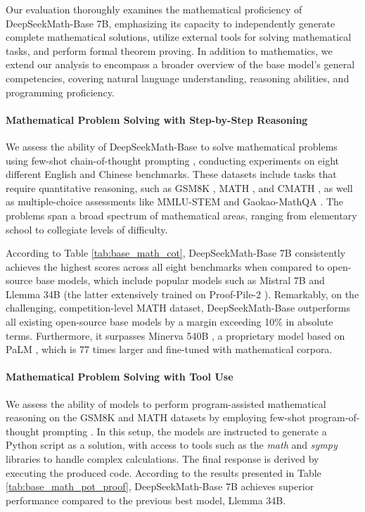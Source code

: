 \begin{itemize}[topsep=0pt]
Our evaluation thoroughly examines the mathematical proficiency of DeepSeekMath-Base 7B, emphasizing its capacity to independently generate complete mathematical solutions, utilize external tools for solving mathematical tasks, and perform formal theorem proving. In addition to mathematics, we extend our analysis to encompass a broader overview of the base model's general competencies, covering natural language understanding, reasoning abilities, and programming proficiency.

\paragraph{Mathematical Problem Solving with Step-by-Step Reasoning}

We assess the ability of DeepSeekMath-Base to solve mathematical problems using few-shot chain-of-thought prompting \citep{cot}, conducting experiments on eight different English and Chinese benchmarks. These datasets include tasks that require quantitative reasoning, such as GSM8K \citep{gsm8k}, MATH \citep{MATH}, and CMATH \citep{wei2023cmath}, as well as multiple-choice assessments like MMLU-STEM \citep{mmlu} and Gaokao-MathQA \citep{agieval}. The problems span a broad spectrum of mathematical areas, ranging from elementary school to collegiate levels of difficulty.

According to Table \ref{tab:base_math_cot}, DeepSeekMath-Base 7B consistently achieves the highest scores across all eight benchmarks when compared to open-source base models, which include popular models such as Mistral 7B \citep{mistral} and Llemma 34B \citep{llemma} (the latter extensively trained on Proof-Pile-2 \citep{llemma}). Remarkably, on the challenging, competition-level MATH dataset, DeepSeekMath-Base outperforms all existing open-source base models by a margin exceeding 10\% in absolute terms. Furthermore, it surpasses Minerva 540B \citep{minerva}, a proprietary model based on PaLM \citep{palm}, which is 77 times larger and fine-tuned with mathematical corpora.

\paragraph{Mathematical Problem Solving with Tool Use} We assess the ability of models to perform program-assisted mathematical reasoning on the GSM8K and MATH datasets by employing few-shot program-of-thought prompting \citep{pot,pal}. In this setup, the models are instructed to generate a Python script as a solution, with access to tools such as the \textit{math} and \textit{sympy} libraries to handle complex calculations. The final response is derived by executing the produced code. According to the results presented in Table \ref{tab:base_math_pot_proof}, DeepSeekMath-Base 7B achieves superior performance compared to the previous best model, Llemma 34B.


\end{itemize}
